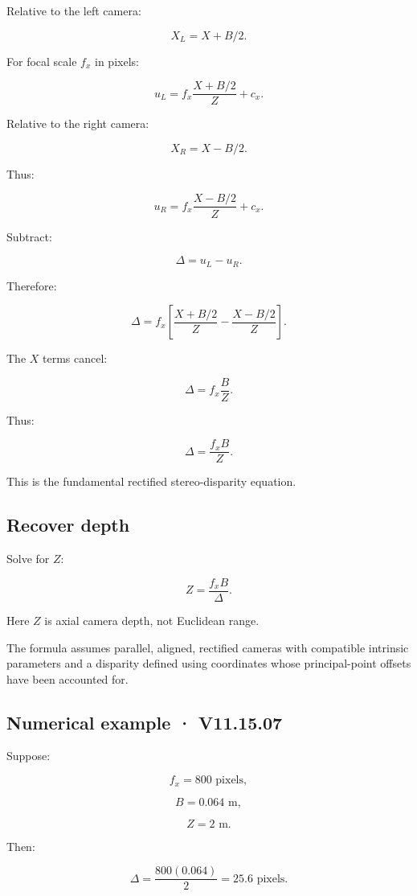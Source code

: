 Relative to the left camera:

\[ X_L=X+B/2. \]

For focal scale \(f_x\) in pixels:

\[ \boxed{ u_L=f_x\frac{X+B/2}{Z}+c_x. } \]

Relative to the right camera:

\[ X_R=X-B/2. \]

Thus:

\[ \boxed{ u_R=f_x\frac{X-B/2}{Z}+c_x. } \]

Subtract:

\[ \Delta=u_L-u_R. \]

Therefore:

\[ \Delta = f_x \left[ \frac{X+B/2}{Z} - \frac{X-B/2}{Z} \right]. \]

The \(X\) terms cancel:

\[ \Delta=f_x\frac BZ. \]

Thus:

\[ \boxed{ \Delta=\frac{f_xB}{Z}. } \]

This is the fundamental rectified stereo-disparity equation.

\subsection{Recover depth}\label{02-foundations-ii-ch035-recover-depth}

Solve for \(Z\):

\[ \boxed{ Z=\frac{f_xB}{\Delta}. } \]

Here \(Z\) is axial camera depth, not Euclidean range.

The formula assumes parallel, aligned, rectified cameras with compatible intrinsic parameters and a disparity defined using coordinates whose principal-point offsets have been accounted for.

\subsection{Numerical example · V11.15.07}\label{02-foundations-ii-ch035-numerical-example-v11.15.07}

Suppose:

\[ f_x=800\text{ pixels}, \]

\[ B=0.064\text{ m}, \]

\[ Z=2\text{ m}. \]

Then:

\[ \Delta=\frac{800(0.064)}2 =\boxed{25.6\text{ pixels}}. \]

